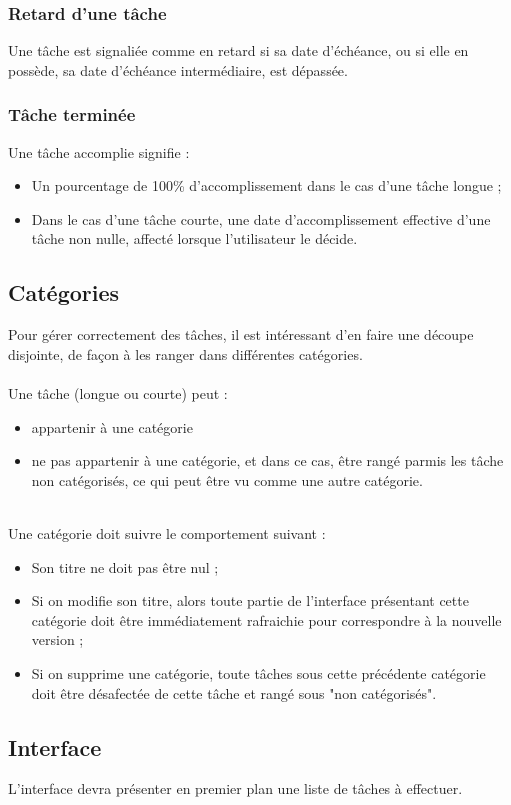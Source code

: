 \documentclass{article}
\begin{document}
			\subsubsection{Retard d'une tâche}
			Une tâche est signaliée comme en retard si sa date d'échéance, ou si elle en possède, sa date d'échéance intermédiaire, est dépassée.
			\subsubsection{Tâche terminée}
			Une tâche accomplie signifie :
			\begin{itemize}
				\item Un pourcentage de 100\% d'accomplissement dans le cas d'une tâche longue ;
				\item Dans le cas d'une tâche courte, une date d'accomplissement effective d'une tâche non nulle, affecté lorsque l'utilisateur le décide.
			\end{itemize}
		\subsection{Catégories}
			Pour gérer correctement des tâches, il est intéressant d'en faire une découpe disjointe, de façon à les ranger dans différentes catégories.
			\\~\\
			Une tâche (longue ou courte) peut :
			\begin{itemize}
				\item appartenir à une catégorie
				\item ne pas appartenir à une catégorie, et dans ce cas, être rangé parmis les tâche non catégorisés, ce qui peut être vu comme une autre catégorie.
			\end{itemize}~\\
			Une catégorie doit suivre le comportement suivant :
			\begin{itemize}
				\item Son titre ne doit pas être nul ;
				\item Si on modifie son titre, alors toute partie de l'interface présentant cette catégorie doit être immédiatement rafraichie pour correspondre à la nouvelle version ;
				\item Si on supprime une catégorie, toute tâches sous cette précédente catégorie doit être désafectée de cette tâche et rangé sous "non catégorisés".
			\end{itemize}
		\subsection{Interface}
			L'interface devra présenter en premier plan une liste de tâches à effectuer.
\end{document}
